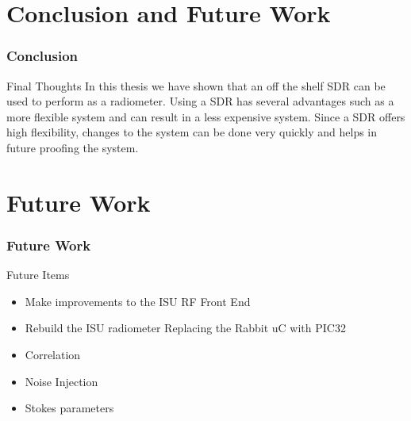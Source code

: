 \documentclass[notes]{beamer}
\begin{document}
\section{Conclusion and Future Work}
\begin{frame}
\frametitle{Conclusion}
\begin{block}{Final Thoughts}
In this thesis we have shown that an off the shelf SDR can be used to perform as a radiometer.  Using a SDR has several advantages such as a more flexible system and can result in a less expensive system.  Since a SDR offers high flexibility, changes to the system can be done very quickly and helps in future proofing the system.  
\end{block}
\end{frame}
\section{Future Work}
\begin{frame}
\frametitle{Future Work}
\begin{block}{Future Items}
\begin{itemize}
\item Make improvements to the ISU RF Front End
\item Rebuild the ISU radiometer
\note Replacing the Rabbit uC with PIC32
\item Correlation
\item Noise Injection
\item Stokes parameters
\end{itemize}
\end{block}
\end{frame}
\end{document}
